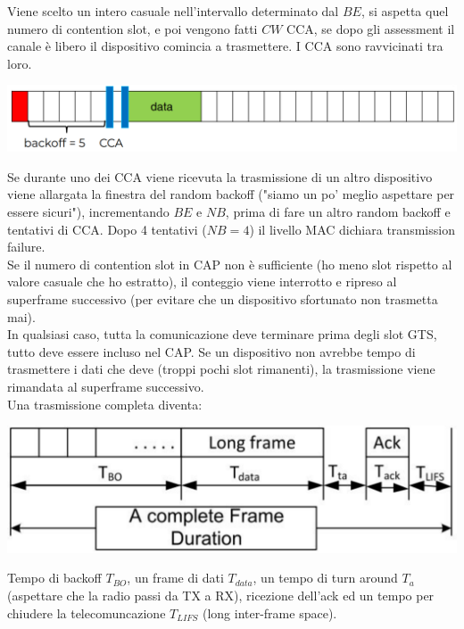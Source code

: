Viene scelto un intero casuale nell'intervallo determinato dal $BE$, si aspetta quel numero di contention slot, e poi vengono fatti $CW$ CCA, se dopo gli assessment il canale è libero il dispositivo comincia a trasmettere. I CCA sono ravvicinati tra loro.\\

\begin{center}
	\includegraphics[width=0.9\linewidth]{img/wpan/zex1}
\end{center}

Se durante uno dei CCA viene ricevuta la trasmissione di un altro dispositivo viene allargata la finestra del random backoff ("siamo un po' meglio aspettare per essere sicuri"), incrementando $BE$ e $NB$, prima di fare un altro random backoff e tentativi di CCA. Dopo 4 tentativi ($NB=4$) il livello MAC dichiara transmission failure.\\

Se il numero di contention slot in CAP non è sufficiente (ho meno slot rispetto al valore casuale che ho estratto), il conteggio viene interrotto e ripreso al superframe successivo (per evitare che un dispositivo sfortunato non trasmetta mai).\\

In qualsiasi caso, tutta la comunicazione deve terminare prima degli slot GTS, tutto deve essere incluso nel CAP. Se un dispositivo non avrebbe tempo di trasmettere i dati che deve (troppi pochi slot rimanenti), la trasmissione viene rimandata al superframe successivo.\\

Una trasmissione completa diventa:
\begin{center}
	\includegraphics[width=0.7\linewidth]{img/wpan/ztran}
\end{center}
Tempo di backoff $T_{BO}$, un frame di dati $T_{data}$, un tempo di turn around $T_a$ (aspettare che la radio passi da TX a RX), ricezione dell'ack ed un tempo per chiudere la telecomuncazione $T_{LIFS}$ (long inter-frame space).\\


